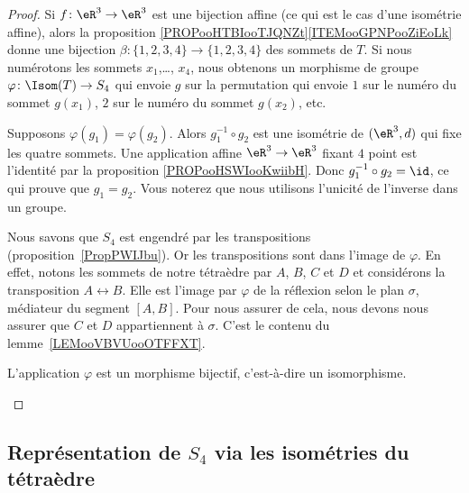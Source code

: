 \begin{proof}
	Si \( f\colon \eR^3\to \eR^3\) est une bijection affine (ce qui est le cas d'une isométrie affine), alors la proposition \ref{PROPooHTBIooTJQNZt}\ref{ITEMooGPNPooZiEoLk} donne une bijection \( \beta\colon \{ 1,2,3,4 \}\to \{ 1,2,3,4 \}\) des sommets de \( T\). Si nous numérotons les sommets \( x_1\),\ldots, \( x_4\), nous obtenons un morphisme de groupe \( \varphi\colon \Isom(T) \to S_4\) qui envoie \( g\) sur la permutation qui envoie \( 1\) sur le numéro du sommet \( g(x_1)\), \( 2\) sur le numéro du sommet \( g(x_2)\), etc.

	\begin{subproof}
		Supposons \( \varphi(g_1)=\varphi(g_2)\). Alors \( g_1^{-1}\circ g_2\) est une isométrie de \( (\eR^3,d)\) qui fixe les quatre sommets. Une application affine \( \eR^3\to\eR^3\) fixant \( 4\) point est l'identité par la proposition \ref{PROPooHSWIooKwiibH}. Donc \( g_1^{-1}\circ g_2=\id\), ce qui prouve que \( g_1=g_2\). Vous noterez que nous utilisons l'unicité de l'inverse dans un groupe.


		Nous savons que \( S_4\) est engendré par les transpositions (proposition~\ref{PropPWIJbu}). Or les transpositions sont dans l'image de \( \varphi\). En effet, notons les sommets de notre tétraèdre par \( A\), \( B\), \( C\) et \( D\) et considérons la transposition \( A\leftrightarrow B\). Elle est l'image par \( \varphi\) de la réflexion selon le plan \( \sigma\), médiateur du segment \( [A,B]\). Pour nous assurer de cela, nous devons nous assurer que \( C\) et \( D\) appartiennent à \( \sigma\). C'est le contenu du lemme~\ref{LEMooVBVUooOTFFXT}.

		\spitem[Conclusion]
		L'application \( \varphi\) est un morphisme bijectif, c'est-à-dire un isomorphisme.

	\end{subproof}
\end{proof}

\subsection{Représentation de \( S_4\) via les isométries du tétraèdre}
\label{SUBSECooVEASooDUbsBh}


